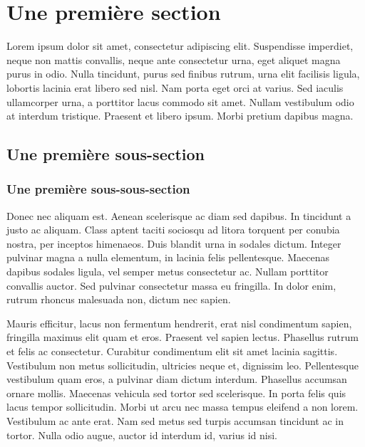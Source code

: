 \documentclass[10pt,fleqn]{article} %
\begin{document}



\section{Une première section}
 Lorem ipsum dolor sit amet, consectetur adipiscing elit. Suspendisse imperdiet, neque non mattis convallis, neque ante consectetur urna, eget aliquet magna purus in odio. Nulla tincidunt, purus sed finibus rutrum, urna elit facilisis ligula, lobortis lacinia erat libero sed nisl. Nam porta eget orci at varius. Sed iaculis ullamcorper urna, a porttitor lacus commodo sit amet. Nullam vestibulum odio at interdum tristique. Praesent et libero ipsum. Morbi pretium dapibus magna.
\subsection{Une première sous-section}
\subsubsection{Une première sous-sous-section}
Donec nec aliquam est. Aenean scelerisque ac diam sed dapibus. In tincidunt a justo ac aliquam. Class aptent taciti sociosqu ad litora torquent per conubia nostra, per inceptos himenaeos. Duis blandit urna in sodales dictum. Integer pulvinar magna a nulla elementum, in lacinia felis pellentesque. Maecenas dapibus sodales ligula, vel semper metus consectetur ac. Nullam porttitor convallis auctor. Sed pulvinar consectetur massa eu fringilla. In dolor enim, rutrum rhoncus malesuada non, dictum nec sapien.

Mauris efficitur, lacus non fermentum hendrerit, erat nisl condimentum sapien, fringilla maximus elit quam et eros. Praesent vel sapien lectus. Phasellus rutrum et felis ac consectetur. Curabitur condimentum elit sit amet lacinia sagittis. Vestibulum non metus sollicitudin, ultricies neque et, dignissim leo. Pellentesque vestibulum quam eros, a pulvinar diam dictum interdum. Phasellus accumsan ornare mollis. Maecenas vehicula sed tortor sed scelerisque. In porta felis quis lacus tempor sollicitudin. Morbi ut arcu nec massa tempus eleifend a non lorem. Vestibulum ac ante erat. Nam sed metus sed turpis accumsan tincidunt ac in tortor. Nulla odio augue, auctor id interdum id, varius id nisi.
\end{document}
